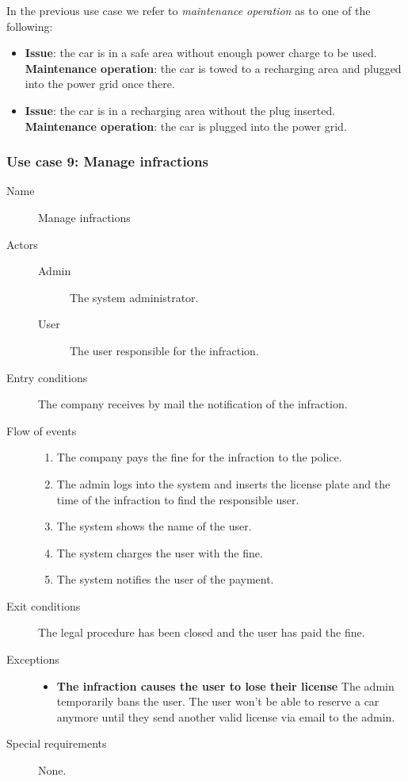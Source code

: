 		In the previous use case we refer to \textit{maintenance operation} as to one of the following:
		\begin{itemize}
			\item \textbf{Issue}: the car is in a safe area without enough power charge to be used. \textbf{Maintenance operation}: the car is towed to a recharging area and plugged into the power grid once there.
			\item \textbf{Issue}: the car is in a recharging area without the plug inserted. \textbf{Maintenance operation}: the car is plugged into the power grid.
		\end{itemize}
	

	\subsubsection{Use case 9: Manage infractions}
		\begin{description}
			\item[Name] Manage infractions
			\item[Actors] \hfill
				\begin{description}
					\item[Admin] The system administrator.
					\item[User] The user responsible for the infraction.
				\end{description}
			\item[Entry conditions] The company receives by mail the notification of the infraction.
			\item[Flow of events] \hfill
				\begin{enumerate}
					\item The company pays the fine for the infraction to the police.
					\item The admin logs into the system and inserts the license plate and the time of the infraction to find the responsible user.
					\item The system shows the name of the user.
					\item The system charges the user with the fine.
					\item The system notifies the user of the payment.
				\end{enumerate}
			\item[Exit conditions] The legal procedure has been closed and the user has paid the fine.
			\item[Exceptions] \hfill
				\begin{itemize}
					\item \textbf{The infraction causes the user to lose their license} The admin temporarily bans the user. The user won't be able to reserve a car anymore until they send another valid license via email to the admin.
				\end{itemize}
			\item[Special requirements] None.
		\end{description}

